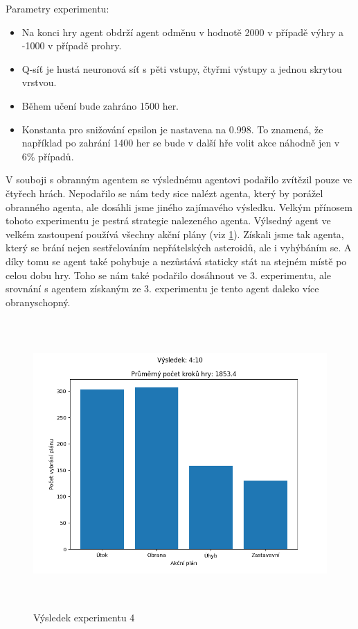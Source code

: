 Parametry experimentu:
\begin{itemize}
    \item Na konci hry agent obdrží agent odměnu v hodnotě 2000 v případě výhry a -1000 v případě prohry.
    \item Q-síť je hustá neuronová síť s pěti vstupy, čtyřmi výstupy a jednou skrytou vrstvou. 
    \item Během učení bude zahráno 1500 her.
    \item Konstanta pro snižování epsilon je nastavena na 0.998. To znamená, že například po zahrání 1400 her se bude v další hře volit akce náhodně jen v 6\% případů. 
\end{itemize}

\par
V souboji s obranným agentem se výslednému agentovi podařilo zvítězil pouze ve čtyřech hrách. 
Nepodařilo se nám tedy sice nalézt agenta, který by porážel obranného agenta, ale dosáhli jsme jiného zajímavého výsledku.
Velkým přínosem tohoto experimentu je pestrá strategie nalezeného agenta. Výlsedný agent ve velkém zastoupení používá všechny akční plány (viz \ref{Výsledek experimentu 04}). 
Získali jsme tak agenta, který se brání nejen sestřelováním nepřátelských asteroidů, ale i vyhýbáním se. A díky tomu se agent také pohybuje a nezůstává staticky stát na stejném místě po celou dobu hry.
Toho se nám také podařilo dosáhnout ve 3. experimentu, ale srovnání s agentem získaným ze 3. experimentu je tento agent daleko více obranyschopný.




\begin{figure}[p]\centering
\includegraphics[width=145mm, height=110mm]{./Obrazky/Experiment04Results.png}
\caption{Výsledek experimentu 4}
\label{Výsledek experimentu 04}
\end{figure}

